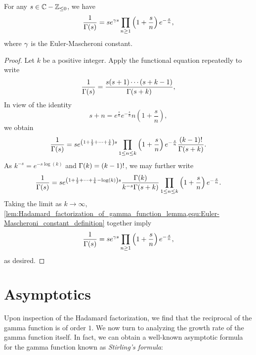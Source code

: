 \documentclass[12pt]{article}
\begin{document}
    \begin{theorem}\label{thm:Hadamard_factorization_for_reciprocal_of_gamma}
      For any \(s \in \mathbb{C}-\mathbb{Z}_{\le 0}\), we have
      \[
        \frac{1}{\Gamma(s)} = se^{\gamma s}\prod_{n \ge 1}\left(1+\frac{s}{n}\right)e^{-\frac{s}{n}},
      \]
      where \(\gamma\) is the Euler-Mascheroni constant.
    \end{theorem}
    \begin{proof}
      Let \(k\) be a positive integer. Apply the functional equation repeatedly to write
      \[
        \frac{1}{\Gamma(s)} = \frac{s(s+1) \cdots (s+k-1)}{\Gamma(s+k)},
      \]
      In view of the identity
      \[
       s+n = e^{\frac{s}{n}}e^{-\frac{s}{n}}n\left(1+\frac{s}{n}\right),
      \]
      we obtain
      \[
        \frac{1}{\Gamma(s)} = se^{\left(1+\frac{1}{2}+\cdots+\frac{1}{k}\right)s}\prod_{1 \le n \le k}\left(1+\frac{s}{n}\right)e^{-\frac{s}{n}}\frac{(k-1)!}{\Gamma(s+k)}.
      \]
      As \(k^{-s}= e^{-s\log(k)}\) and \(\Gamma(k) = (k-1)!\), we may further write
      \[
        \frac{1}{\Gamma(s)} = se^{\left(1+\frac{1}{2}+\cdots+\frac{1}{k}-\log(k)\right)s}\frac{\Gamma(k)}{k^{-s}\Gamma(s+k)}\prod_{1 \le n \le k}\left(1+\frac{s}{n}\right)e^{-\frac{s}{n}}.
      \]
      Taking the limit as \(k \to \infty\), \cref{lem:Hadamard_factorization_of_gamma_function_lemma,equ:Euler-Mascheroni_constant_definition} together imply
      \[
        \frac{1}{\Gamma(s)} = se^{\gamma s}\prod_{n \ge 1}\left(1+\frac{s}{n}\right)e^{-\frac{s}{n}},
      \]
      as desired.
    \end{proof}   
  \section{Asymptotics}
    Upon inspection of the Hadamard factorization, we find that the reciprocal of the gamma function is of order \(1\). We now turn to analyzing the growth rate of the gamma function itself. In fact, we can obtain a well-known asymptotic formula for the gamma function known as \textit{Stirling's formula}:
\end{document}
